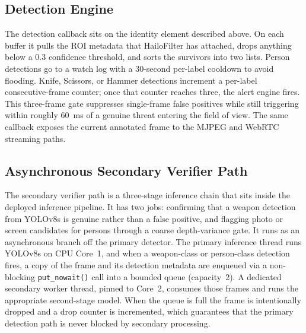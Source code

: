 \documentclass{ieeeaccess}
\begin{document}
\subsection{Detection Engine}
The detection callback sits on the identity element described above. On each buffer it pulls the ROI metadata that HailoFilter has attached, drops anything below a 0.3 confidence threshold, and sorts the survivors into two lists. Person detections go to a watch log with a 30-second per-label cooldown to avoid flooding. Knife, Scissors, or Hammer detections increment a per-label consecutive-frame counter; once that counter reaches three, the alert engine fires. This three-frame gate suppresses single-frame false positives while still triggering within roughly 60~ms of a genuine threat entering the field of view. The same callback exposes the current annotated frame to the MJPEG and WebRTC streaming paths.


\subsection{Asynchronous Secondary Verifier Path}
\label{sec:verifier_path}
The secondary verifier path is a three-stage inference chain that sits inside the deployed inference pipeline. It has two jobs: confirming that a weapon detection from YOLOv8s is genuine rather than a false positive, and flagging photo or screen candidates for persons through a coarse depth-variance gate. It runs as an asynchronous branch off the primary detector. The primary inference thread runs YOLOv8s on CPU Core~1, and when a weapon-class or person-class detection fires, a copy of the frame and its detection metadata are enqueued via a non-blocking \texttt{put\_nowait()} call into a bounded queue (capacity~2). A dedicated secondary worker thread, pinned to Core~2, consumes those frames and runs the appropriate second-stage model. When the queue is full the frame is intentionally dropped and a drop counter is incremented, which guarantees that the primary detection path is never blocked by secondary processing.
\end{document}
